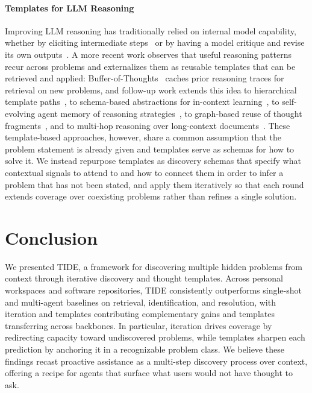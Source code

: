 \documentclass{llmxive}
\begin{document}
\paragraph{Templates for LLM Reasoning}
Improving LLM reasoning has traditionally relied on internal model capability, whether by eliciting intermediate steps~\cite{cot, zeroshotcot} or by having a model critique and revise its own outputs~\cite{self-refine, reflexion}. A more recent work observes that useful reasoning patterns recur across problems and externalizes them as reusable templates that can be retrieved and applied: Buffer-of-Thoughts~\cite{BoT} caches prior reasoning traces for retrieval on new problems, and follow-up work extends this idea to hierarchical template paths~\cite{ReasonFlux, SuperCorrect}, to schema-based abstractions for in-context learning~\cite{SA-ICL}, to self-evolving agent memory of reasoning strategies~\cite{ReasoningBank}, to graph-based reuse of thought fragments~\cite{RoT}, and to multi-hop reasoning over long-context documents~\cite{ToTAL}. These template-based approaches, however, share a common assumption that the problem statement is already given and templates serve as schemas for how to solve it. We instead repurpose templates as discovery schemas that specify what contextual signals to attend to and how to connect them in order to infer a problem that has not been stated, and apply them iteratively so that each round extends coverage over coexisting problems rather than refines a single solution.

\section{Conclusion}
We presented \textsc{TIDE}, a framework for discovering multiple hidden problems from context through iterative discovery and thought templates.
Across personal workspaces and software repositories, \textsc{TIDE} consistently outperforms single-shot and multi-agent baselines on retrieval, identification, and resolution, with iteration and templates contributing complementary gains and templates transferring across backbones.
In particular, iteration drives coverage by redirecting capacity toward undiscovered problems, while templates sharpen each prediction by anchoring it in a recognizable problem class.
We believe these findings recast proactive assistance as a multi-step discovery process over context, offering a recipe for agents that surface what users would not have thought to ask.
\end{document}
